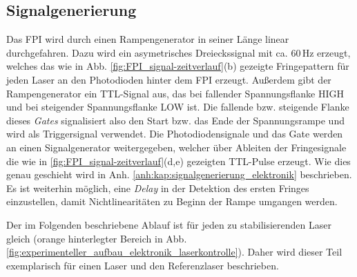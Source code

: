 \subsection{Signalgenerierung}\label{subsec:signalgenerierung}
Das FPI wird durch einen Rampengenerator in seiner Länge linear durchgefahren.
Dazu wird ein asymetrisches Dreieckssignal mit ca. $60\,$Hz erzeugt, welches das
wie in Abb.
\ref{fig:FPI_signal-zeitverlauf}(b) gezeigte Fringepattern für jeden Laser
an den Photodioden hinter dem FPI erzeugt. Außerdem gibt der Rampengenerator
ein TTL-Signal aus, das bei fallender Spannungsflanke HIGH und bei
steigender Spannungsflanke LOW ist. Die fallende bzw. steigende Flanke dieses
\textit{Gates} signalisiert also den Start bzw. das Ende der Spannungsrampe
und wird als Triggersignal verwendet. Die Photodiodensignale und das
Gate werden an einen Signalgenerator weitergegeben, welcher über Ableiten der
Fringesignale die wie in \ref{fig:FPI_signal-zeitverlauf}(d,e) gezeigten TTL-Pulse erzeugt.
Wie dies genau geschieht wird in Anh.
\ref{anh:kap:signalgenerierung_elektronik} beschrieben. Es ist weiterhin
möglich, eine \textit{Delay} in der Detektion des ersten Fringes einzustellen,
damit Nichtlinearitäten zu Beginn der Rampe umgangen werden.\par
Der im Folgenden beschriebene Ablauf ist für jeden zu stabilisierenden Laser
gleich (orange hinterlegter Bereich in Abb.
\ref{fig:experimenteller_aufbau_elektronik_laserkontrolle}). Daher wird dieser
Teil exemplarisch für einen Laser und den Referenzlaser beschrieben.

